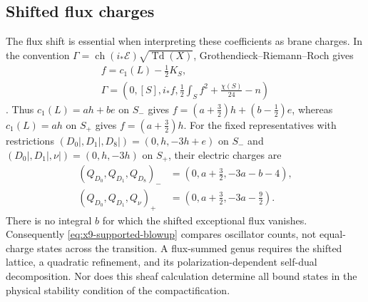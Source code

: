 \subsection{Shifted flux charges}
The flux shift is essential when interpreting these coefficients as
brane charges. In the convention
$\Gamma=\operatorname{ch}(i_*\mathcal E)\sqrt{\operatorname{Td}(X)}$,
Grothendieck--Riemann--Roch gives
\begin{equation}
 \begin{gathered}
 f=c_1(L)-\frac12K_S,\\
 \Gamma=\left(0,[S],i_*f,\frac12\int_S f^2+\frac{\chi(S)}{24}-n\right)
 \end{gathered}
 \label{eq:x9-supported-mukai}
\end{equation}
\cite[Appendix~B.1]{Alim:2010M5}. Thus $c_1(L)=ah+be$ on
$S_-$ gives $f=(a+\tfrac32)h+(b-\tfrac12)e$, whereas
$c_1(L)=ah$ on $S_+$ gives $f=(a+\tfrac32)h$. For the fixed representatives with restrictions
$(D_0|,D_1|,D_8|)=(0,h,-3h+e)$ on $S_-$ and
$(D_0|,D_1|,\nu|)=(0,h,-3h)$ on $S_+$, their electric
charges are
\begin{equation}
 \begin{aligned}
 (Q_{D_0},Q_{D_1},Q_{D_8})_-&=(0,a+\tfrac32,-3a-b-4),\\
 (Q_{D_0},Q_{D_1},Q_\nu)_+&=(0,a+\tfrac32,-3a-\tfrac92).
 \end{aligned}
 \label{eq:x9-supported-flux-charges}
\end{equation}
There is no integral $b$ for which the shifted exceptional flux vanishes.
Consequently \eqref{eq:x9-supported-blowup} compares oscillator counts,
not equal-charge states across the transition. A flux-summed genus
requires the shifted lattice, a quadratic refinement, and its
polarization-dependent self-dual decomposition. Nor does this sheaf
calculation determine all bound states in the physical stability
condition of the compactification.

